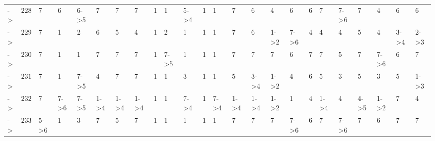 \documentclass[6pt]{article}
\begin{document}
\begin{landscape}
{\begin{longtable}{lrllllllllllllllllllllll}
\newpage
-\textgreater &$228$&7&6&6-\textgreater 5&7&7&7&1&1&5-\textgreater 4&1&1&7&6&4&6&6&7&7-\textgreater 6&7&4&6&6\tabularnewline
-\textgreater &$229$&7&1&2&6&5&4&1&2&1&1&1&7&6&1-\textgreater 2&7-\textgreater 6&4&4&4&5&4&3-\textgreater 4&2-\textgreater 3\tabularnewline
-\textgreater &$230$&7&1&1&7&7&7&1&7-\textgreater 5&1&1&1&7&7&7&6&7&7&5&7&7-\textgreater 6&6&7\tabularnewline
-\textgreater &$231$&7&1&7-\textgreater 5&4&7&7&1&1&3&1&1&5&3-\textgreater 4&1-\textgreater 2&4&6&5&3&5&3&5&1-\textgreater 3\tabularnewline
-\textgreater &$232$&7&7-\textgreater 6&7-\textgreater 5&1-\textgreater 4&1-\textgreater 4&1-\textgreater 4&1&1&7-\textgreater 4&1&7-\textgreater 4&1-\textgreater 4&1-\textgreater 4&1-\textgreater 2&1&4&1-\textgreater 4&4&4-\textgreater 5&1-\textgreater 2&7&4\tabularnewline
-\textgreater &$233$&5-\textgreater 6&1&3&7&5&7&1&1&1&1&1&7&7&7&7-\textgreater 6&6&7&7-\textgreater 6&7&6&7&7\tabularnewline
\hline
\end{longtable}}\end{landscape}
\end{document}
